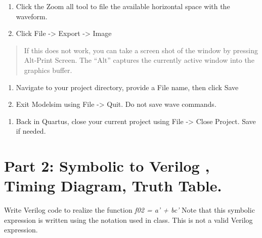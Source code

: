 \documentclass[
]{article}
\begin{document}
\begin{enumerate}
\def\labelenumi{\alph{enumi}.}
\setcounter{enumi}{2}
\item
  Click the Zoom all tool to file the available horizontal space with
  the waveform.
\item
  Click File -\textgreater{} Export -\textgreater{} Image
\end{enumerate}

\begin{quote}
If this does not work, you can take a screen shot of the window by
pressing Alt-Print Screen. The ``Alt'' captures the currently active
window into the graphics buffer.
\end{quote}

\begin{enumerate}
\def\labelenumi{\alph{enumi}.}
\setcounter{enumi}{4}
\item
  Navigate to your project directory, provide a File name, then click
  Save
\item
  Exit Modelsim using File -\textgreater{} Quit. Do not save wave
  commands.
\end{enumerate}

\begin{enumerate}
\def\labelenumi{\arabic{enumi}.}
\setcounter{enumi}{23}
\item
  Back in Quartus, close your current project using File -\textgreater{}
  Close Project. Save if needed.
\end{enumerate}

\hypertarget{part-2-symbolic-to-verilog-timing-diagram-truth-table.}{%
\section{\texorpdfstring{Part 2: Symbolic to Verilog , Timing Diagram,
Truth Table.
}{Part 2: Symbolic to Verilog , Timing Diagram, Truth Table. }}\label{part-2-symbolic-to-verilog-timing-diagram-truth-table.}}

Write Verilog code to realize the function \emph{f02 = a' + bc'} Note
that this symbolic expression is written using the notation used in
class. This is not a valid Verilog expression.
\end{document}
